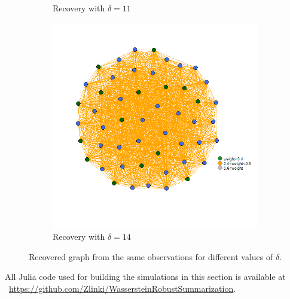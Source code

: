 \documentclass[12pt]{amsart}
\theoremstyle{remark}
\begin{document}
\begin{figure}[H]
\begin{subfigure}[b]{0.37\textwidth}
         \caption{Recovery with $\delta=11$}
     \end{subfigure}
      \hfill
     \begin{subfigure}[b]{0.37\textwidth}
         \centering
         \includegraphics[width=\textwidth]{./Pictures/recupera8.png}
         \caption{Recovery with $\delta=14$}
     \end{subfigure}
        \caption{\small{Recovered graph from the same observations for different values of $\delta$. }}
        \label{fig:recupera}
\end{figure}








All Julia code used for building the simulations in this section is available at ~\url{https://github.com/Zlinki/WassersteinRobustSummarization}.
\end{document}
